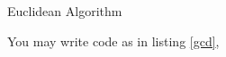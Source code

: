 \documentclass{../src/homework}
\begin{document}
\newpage

\begin{bonus} Euclidean Algorithm

  You may write code as in listing \ref{gcd},
  
  
\end{bonus}


 

\end{document}
